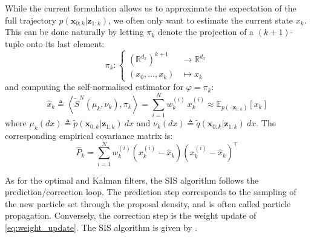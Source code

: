While the current formulation allows us to approximate the expectation of the full trajectory $p(\mathbf{x}_{0:k}|\mathbf{z}_{1:k})$, we often only want to estimate the current state $x_k$. This can be done naturally by letting $\pi_k$ denote the projection of a $(k+1)$-tuple onto its last element:
\begin{equation}
	\pi_k:\left\{\begin{aligned}
	\left(\mathbb{R}^{d_x}\right)^{k+1}&\rightarrow\mathbb{R}^{d_x}\\
	(x_0,\dots,x_k)&\mapsto x_k
	\end{aligned}\right.
\end{equation}
and computing the self-normalised estimator for $\varphi=\pi_k$:
\begin{equation}
	\hat{x}_k\triangleq\left\langle\tilde{S}^N(\mu_k,\nu_k),\pi_k\right\rangle=\sum_{i=1}^Nw_k^{(i)}\:x_k^{(i)}\approx\mathbb{E}_{p(\cdot|\mathbf{z}_{1:k})}[x_k]
\end{equation}
where $\mu_k(dx)\triangleq\tilde{p}(\mathbf{x}_{0:k}|\mathbf{z}_{1:k})\:dx$ and $\nu_k(dx)\triangleq\tilde{q}(\mathbf{x}_{0:k}|\mathbf{z}_{1:k})\:dx$. The corresponding empirical covariance matrix is:
\begin{equation}
	\hat{P}_k=\sum_{i=1}^Nw_k^{(i)}\left(x_k^{(i)}-\hat{x}_k\right)\left(x_k^{(i)}-\hat{x}_k\right)^\top
\end{equation}

As for the optimal and Kalman filters, the SIS algorithm follows the prediction/correction loop. The prediction step corresponds to the sampling of the new particle set through the proposal density, and is often called particle propagation. Conversely, the correction step is the weight update of \eqref{eq:weight_update}. The SIS algorithm is given by .

\begin{algorithm}[H]
	\begin{algorithmic}
	\end{algorithmic}\caption{Sequential Importance Sampling}\label{alg:SIS}
\end{algorithm}

